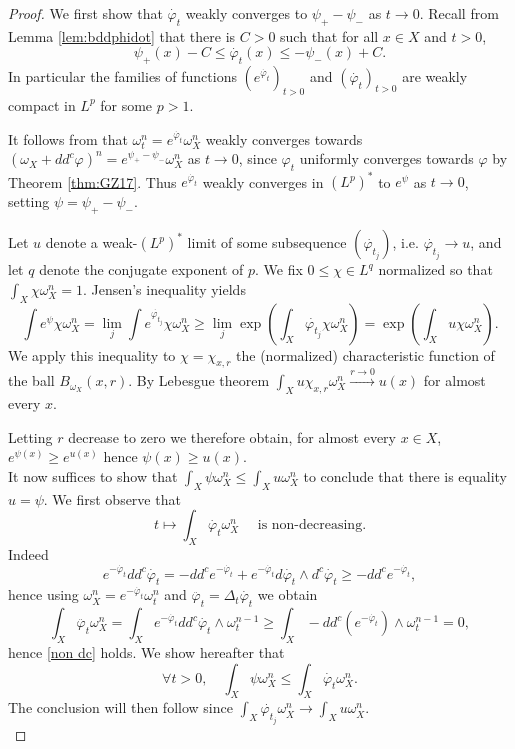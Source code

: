 \documentclass[a4paper,11pt,leqno,english]{smfart}
\theoremstyle{plain}
\theoremstyle{plain}
\numberwithin{equation}{section} %
\numberwithin{figure}{section} %
\theoremstyle{plain}
\theoremstyle{plain}
\theoremstyle{remark}
\theoremstyle{remark}
\theoremstyle{definition}
\theoremstyle{plain}
\theoremstyle{plain}
\theoremstyle{definition}
\newcommand{\f}{\varphi}
\newcommand{\p}{\psi}
\renewcommand{\le}{\leq}
\begin{document}
\begin{proof}
We first show that $\dot{\f_t}$ weakly converges to 
$\p_+-\p_-$ as $t \rightarrow 0$.
Recall from Lemma \ref{lem:bddphidot} that there is $C>0$ such that for all $x \in X$ and $t>0$,
$$
\p_+(x)-C \leq \dot{\f_t}(x) \leq -\p_-(x)+C.
$$
In particular the families of functions $(e^{\dot{\f_t}})_{t>0}$ and
 $(\dot{\f_t})_{t>0}$ are weakly compact in $L^p$ for some $p>1$.
 
It follows from   \cite[Theorem 4.26]{GZbook}
that  $\omega_t^n =e^{\dot{\f_t}} \omega_X^n$ weakly converges towards $(\omega_X+dd^c \f)^n=e^{\p_+-\p_-} \omega_X^n$
as $t \rightarrow 0$, since $\f_t$ uniformly converges towards $\f$ by Theorem \ref{thm:GZ17}.
Thus $e^{\dot{\f_t}}$ weakly converges in $(L^p)^*$ to $e^{\p}$
as $t \rightarrow 0$, setting $\p=\p_+-\p_-$.
 
Let $u$ denote a weak-$(L^p)^*$ limit of some subsequence $(\dot{\f_{t_j}})$, i.e. $\dot{\f_{t_j}} \rightarrow u$,
and let $q$ denote the conjugate exponent of $p$.
We  fix $0 \leq \chi \in L^q$ normalized so that $\int_X \chi \omega_X^n=1$.
Jensen's inequality yields
$$
\int  e^{\p} \chi \omega_X^n =
\lim_j \int  e^{\dot{\f_{t_j}}} \chi \omega_X^n \geq \lim_j \exp  \left( \int_X  \dot{\f_{t_j}} \chi \omega_X^n \right)
=\exp  \left( \int_X  u \chi \omega_X^n \right).
$$
We apply this inequality to $\chi=\chi_{x,r}$ the (normalized) characteristic function of the ball $B_{\omega_X}(x,r)$.
By Lebesgue theorem $\int_X  u \chi_{x,r} \omega_X^n \stackrel{r \rightarrow 0}{\longrightarrow} u(x)$ for almost every $x$.

Letting $r$ decrease to zero we therefore obtain, for almost every $x \in X$, $e^{\p(x)} \geq e^{u(x)}$ hence $\p(x) \geq u(x)$.\\





It now suffices to show that
$\int_X \psi \omega_X^n \leq \int_X u \omega_X^n$
to conclude that there is equality $ u=\psi$.
We first observe that 
\begin{equation}
\label{non dc}
t \mapsto \int_X \dot{\f_t} \omega_X^n\quad \mbox{ is non-decreasing.}
\end{equation} Indeed
$$
e^{-\dot{\f_t}} dd^c \dot{\f_t}
=-dd^c e^{-\dot{\f_t}} + e^{-\dot{\f_t}} d\dot{\f_t} \wedge d^c \dot{\f_t} 
\geq -dd^c e^{-\dot{\f_t}},
$$
hence using $\omega_X^n=e^{-\dot{\f_t}} \omega_t^n$ and $\ddot{\f_t}=\Delta_t \dot{\f_t}$ we obtain
$$
\int_X  \ddot{\f_t} \omega_X^n =
\int_X e^{-\dot{\f_t}} dd^c \dot{\f_t} \wedge \omega_t^{n-1} 
\geq  \int_X -dd^c \left( e^{-\dot{\f_t}} \right) \wedge \omega_t^{n-1}=0,
$$
hence \eqref{non dc} holds. 
We show hereafter that 
\begin{equation}
\label{non dc 2}
\forall t>0, \quad  \int_X\psi \omega_X^n\le \int_X \dot{\f_t} \omega_X^n .
\end{equation}
The conclusion will then follow since $\int_X \dot{\f_{t_j}} \omega_X^n  \rightarrow \int_X u \omega_X^n$.\\



\end{proof}
\end{document}
